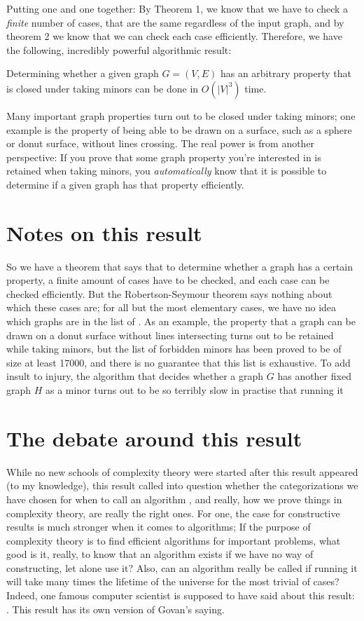 Putting one and one together: By Theorem 1, we know that we have to check a \emph{finite} number of cases, that are the same regardless of the input graph, and by theorem 2 we know that we can check each case efficiently. Therefore, we have the following, incredibly powerful algorithmic result:
\begin{theorem}
Determining whether a given graph $G=(V, E)$ has an arbitrary property that is closed under taking minors can be done in $O(\lvert V\rvert^3)$ time.
\end{theorem}
Many important graph properties turn out to be closed under taking minors; one example is the property of being able to be drawn on a surface, such as a sphere or donut surface, without lines crossing. The real power is from another perspective: If you prove that some graph property you're interested in is retained when taking minors, you \emph{automatically} know that it is possible to determine if a given graph has that property efficiently. 

\section{Notes on this result}
So we have a theorem that says that to determine whether a graph has a certain property, a finite amount of cases have to be checked, and each case can be checked efficiently. But the Robertson-Seymour theorem says nothing about which these cases are; for all but the most elementary cases, we have no idea which graphs are in the list of . As an example, the property that a graph can be drawn on a donut surface without lines intersecting turns out to be retained while taking minors, but the list of forbidden minors has been proved to be of size at least 17000, and there is no guarantee that this list is exhaustive. To add insult to injury, the algorithm that decides whether a graph $G$ has another fixed graph $H$ as a minor turns out to be so terribly slow in practise that running it 

\section{The debate around this result}
While no new schools of complexity theory were started after this result appeared (to my knowledge), this result called into question whether the categorizations we have chosen for when to call an algorithm , and really, how we prove things in complexity theory, are really the right ones. For one, the case for constructive results is much stronger when it comes to algorithms; If the purpose of complexity theory is to find efficient algorithms for important problems, what good is it, really, to know that an algorithm exists if we have no way of constructing, let alone use it? Also, can an algorithm really be called  if running it will take many times the lifetime of the universe for the most trivial of cases? Indeed, one famous computer scientist is supposed to have said about this result: . This result has its own version of Govan's saying. 

